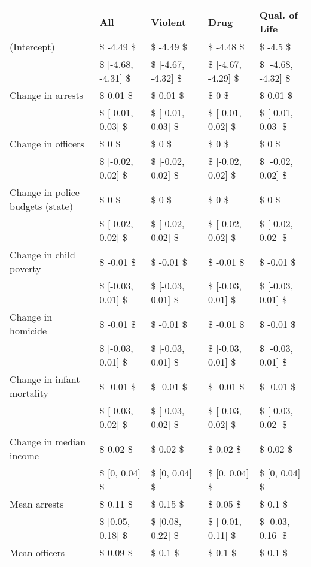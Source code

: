 \begin{table}[ht]
\centering
\begin{tabular}{lllll}
  \hline
  & All & Violent & Drug & Qual. of Life \\ 
  \hline
(Intercept) & \$ -4.49 \$ & \$ -4.49 \$ & \$ -4.48 \$ & \$ -4.5 \$ \\ 
   & \$ [-4.68, -4.31] \$ & \$ [-4.67, -4.32] \$ & \$ [-4.67, -4.29] \$ & \$ [-4.68, -4.32] \$ \\ 
  Change in arrests & \$ 0.01 \$ & \$ 0.01 \$ & \$ 0 \$ & \$ 0.01 \$ \\ 
   & \$ [-0.01, 0.03] \$ & \$ [-0.01, 0.03] \$ & \$ [-0.01, 0.02] \$ & \$ [-0.01, 0.03] \$ \\ 
  Change in officers & \$ 0 \$ & \$ 0 \$ & \$ 0 \$ & \$ 0 \$ \\ 
   & \$ [-0.02, 0.02] \$ & \$ [-0.02, 0.02] \$ & \$ [-0.02, 0.02] \$ & \$ [-0.02, 0.02] \$ \\ 
  Change in police budgets (state) & \$ 0 \$ & \$ 0 \$ & \$ 0 \$ & \$ 0 \$ \\ 
   & \$ [-0.02, 0.02] \$ & \$ [-0.02, 0.02] \$ & \$ [-0.02, 0.02] \$ & \$ [-0.02, 0.02] \$ \\ 
  Change in child poverty & \$ -0.01 \$ & \$ -0.01 \$ & \$ -0.01 \$ & \$ -0.01 \$ \\ 
   & \$ [-0.03, 0.01] \$ & \$ [-0.03, 0.01] \$ & \$ [-0.03, 0.01] \$ & \$ [-0.03, 0.01] \$ \\ 
  Change in homicide & \$ -0.01 \$ & \$ -0.01 \$ & \$ -0.01 \$ & \$ -0.01 \$ \\ 
   & \$ [-0.03, 0.01] \$ & \$ [-0.03, 0.01] \$ & \$ [-0.03, 0.01] \$ & \$ [-0.03, 0.01] \$ \\ 
  Change in infant mortality & \$ -0.01 \$ & \$ -0.01 \$ & \$ -0.01 \$ & \$ -0.01 \$ \\ 
   & \$ [-0.03, 0.02] \$ & \$ [-0.03, 0.02] \$ & \$ [-0.03, 0.02] \$ & \$ [-0.03, 0.02] \$ \\ 
  Change in median income & \$ 0.02 \$ & \$ 0.02 \$ & \$ 0.02 \$ & \$ 0.02 \$ \\ 
   & \$ [0, 0.04] \$ & \$ [0, 0.04] \$ & \$ [0, 0.04] \$ & \$ [0, 0.04] \$ \\ 
  Mean arrests & \$ 0.11 \$ & \$ 0.15 \$ & \$ 0.05 \$ & \$ 0.1 \$ \\ 
   & \$ [0.05, 0.18] \$ & \$ [0.08, 0.22] \$ & \$ [-0.01, 0.11] \$ & \$ [0.03, 0.16] \$ \\ 
  Mean officers & \$ 0.09 \$ & \$ 0.1 \$ & \$ 0.1 \$ & \$ 0.1 \$ \\ 

\end{tabular}
\end{table}
